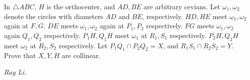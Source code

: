 In $\triangle ABC$, $H$ is the orthocenter, and $AD,BE$ are arbitrary cevians. Let $\omega_1, \omega_2$ denote the circles with diameters $AD$ and $BE$, respectively. $HD,HE$ meet $\omega_1,\omega_2$ again at $F,G$. $DE$ meets $\omega_1,\omega_2$ again at $P_1,P_2$ respectively. $FG$ meets $\omega_1,\omega_2$ again $Q_1,Q_2$ respectively. $P_1H,Q_1H$ meet $\omega_1$ at $R_1,S_1$ respectively. $P_2H,Q_2H$ meet $\omega_2$ at $R_2,S_2$ respectively. Let $P_1Q_1\cap P_2Q_2 = X$, and $R_1S_1\cap R_2S_2=Y$. Prove that $X,Y,H$ are collinear.

\textit{Ray Li.}